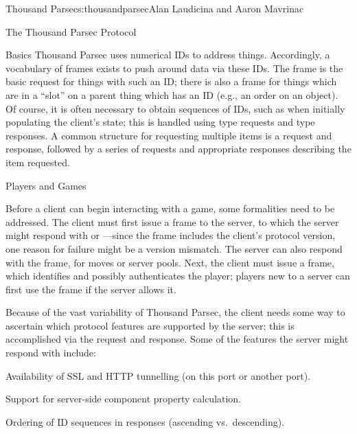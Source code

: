 \begin{aosachapter}{Thousand Parsec}{s:thousandparsec}{Alan Laudicina and Aaron Mavrinac}
\begin{aosasect1}{The Thousand Parsec Protocol}
\begin{aosasect2}{Basics}
Thousand Parsec uses numerical IDs to address things. Accordingly, a
vocabulary of frames exists to push around data via these IDs. The
 frame is the basic request for things with such an
ID; there is also a  frame for things which
are in a ``slot'' on a parent thing which has an ID (e.g., an order on
an object). Of course, it is often necessary to obtain sequences of
IDs, such as when initially populating the client's state; this is
handled using  type requests and  type responses. A common structure for requesting multiple
items is a  request and 
response, followed by a series of  requests and
appropriate responses describing the item requested.

\end{aosasect2}

\begin{aosasect2}{Players and Games}

Before a client can begin interacting with a game, some formalities
need to be addressed. The client must first issue a 
frame to the server, to which the server might respond with 
or ---since the  frame includes the client's
protocol version, one reason for failure might be a version
mismatch. The server can also respond with the  frame,
for moves or server pools. Next, the client must issue a 
frame, which identifies and possibly authenticates the player; players
new to a server can first use the  frame if the
server allows it.

Because of the vast variability of Thousand Parsec, the client needs
some way to ascertain which protocol features are supported by the
server; this is accomplished via the  request and
 response. Some of the features the server might
respond with include:

\begin{aosaitemize}

  \item Availability of SSL and HTTP tunnelling (on this port or another
  port).

  \item Support for server-side component property calculation.

  \item Ordering of ID sequences in responses (ascending vs.\ descending).


\end{aosaitemize}
\end{aosasect2}
\end{aosasect1}
\end{aosachapter}
